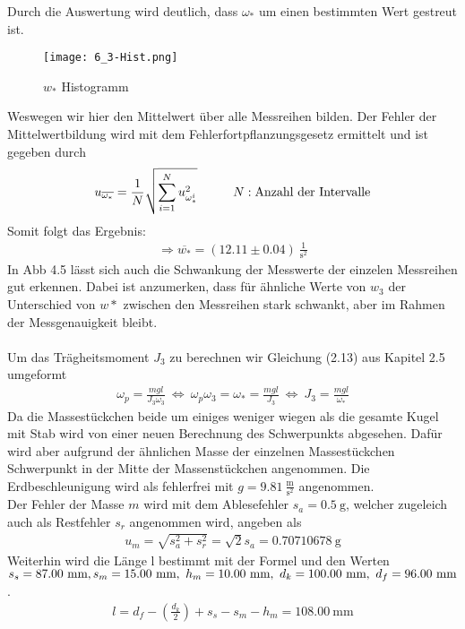 Durch die Auswertung wird deutlich, dass $\omega_*$ um einen bestimmten Wert gestreut ist. 
\begin{figure}[ht]
    \centering
    \caption{$w_*$ Histogramm}
    \texttt{[image: 6\_3-Hist.png]}
\end{figure}
Weswegen wir hier den Mittelwert über alle Messreihen bilden. Der Fehler der Mittelwertbildung wird mit dem Fehlerfortpflanzungsgesetz ermittelt und ist gegeben durch
\begin{align}
    u_{\overline{\omega_*}}=\frac{1}{N}\sqrt{\sum_{i=1}^{N} u_{\omega_*^i}^2}\tab N:\text{Anzahl der Intervalle}
\end{align}
Somit folgt das Ergebnis:
\begin{align*}
    \Rightarrow\boxed{\overline{w_*}=(12.11 \pm 0.04)~\frac{1}{\text{s}^2}}
\end{align*}
In Abb 4.5 lässt sich auch die Schwankung der Messwerte der einzelen Messreihen gut erkennen. Dabei ist anzumerken, dass für ähnliche Werte von $w_3$ der Unterschied von $w*$ zwischen den Messreihen stark schwankt, aber im Rahmen der Messgenauigkeit bleibt.\\ \\
Um das Trägheitsmoment $J_3$ zu berechnen wir Gleichung (2.13) aus Kapitel 2.5 umgeformt
\begin{align}
    \omega_p = \frac{mgl}{J_3\omega_3}~\Leftrightarrow~\omega_p\omega_3 = \omega_* = \frac{mgl}{J_3}~\Leftrightarrow~J_3 = \frac{mgl}{\omega_*}
\end{align}
Da die Massestückchen beide um einiges weniger wiegen als die gesamte Kugel mit Stab wird von einer neuen Berechnung des Schwerpunkts abgesehen. Dafür wird aber aufgrund der ähnlichen Masse der einzelnen Massestückchen Schwerpunkt in der Mitte der Massenstückchen angenommen. Die Erdbeschleunigung wird als fehlerfrei mit $g=9.81~\frac{\text{m}}{\text{s}^2}$ angenommen. \\
Der Fehler der Masse $m$ wird mit dem Ablesefehler $s_a=0.5~\text{g}$, welcher zugeleich auch als Restfehler $s_r$ angenommen wird, angeben als
\begin{align}
    u_m=\sqrt{s_a^2+s_r^2}=\sqrt{2}s_a=0.70710678~\text{g}
\end{align}
Weiterhin wird die Länge l bestimmt mit der Formel und den Werten $s_s=87.00~\text{mm},~\\s_m=15.00~\text{mm},~h_m=10.00~\text{mm},~d_k=100.00~\text{mm},~d_f=96.00~\text{mm}$.
\begin{align}
    l = d_f - \left(\frac{d_k}{2}\right) + s_s - s_m - h_m=108.00~\text{mm} 
\end{align}
